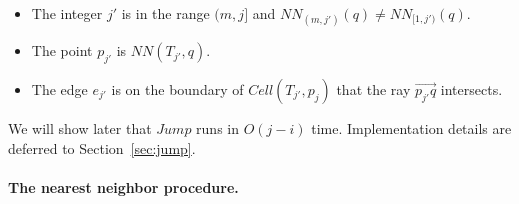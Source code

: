 \documentclass[12pt,a4paper,USenglish,cleveref, autoref, thm-restate]{article}
\newcommand{\ovar}[1]{\overrightarrow{#1}}
\newcommand{\Cell}{\mathit{Cell}}
\newcommand{\NN}{\mathit{NN}}
\newcommand{\ovar}[1]{\overrightarrow{#1}}
\newcommand{\Cell}{\mathit{Cell}}
\newcommand{\NN}{\mathit{NN}}
\newcommand{\ovar}[1]{\overrightarrow{#1}}
\newcommand{\Cell}{\mathit{Cell}}
\newcommand{\NN}{\mathit{NN}}
\begin{document}
{\begin{itemize}
\begin{itemize}
\begin{itemize}
    \setlength{\itemsep}{1pt}
    \setlength{\parskip}{0pt}
    \setlength{\parsep}{0pt} 
         \item The integer $j'$ is in the range $(m,  j]$ and 
         $\NN_{(m,j')}(q) \not = \NN_{[1,j')}(q)$.
         \item The point $p_{j'}$ is $ \NN(T_{j'},q)$.
         \item The edge $e_{j'}$ is on the boundary of $\Cell(T_{j'},p_j)$ that the ray $\ovar{p_{j'}q}$ intersects.
 \end{itemize}   
 	\end{itemize}
 \end{itemize}
 }
 \jumpdef
We will show later that $Jump$ runs in $O(j-i)$ time. Implementation details are deferred to Section~\ref{sec:jump}.
\paragraph*{The nearest neighbor procedure.}
\end{document}

